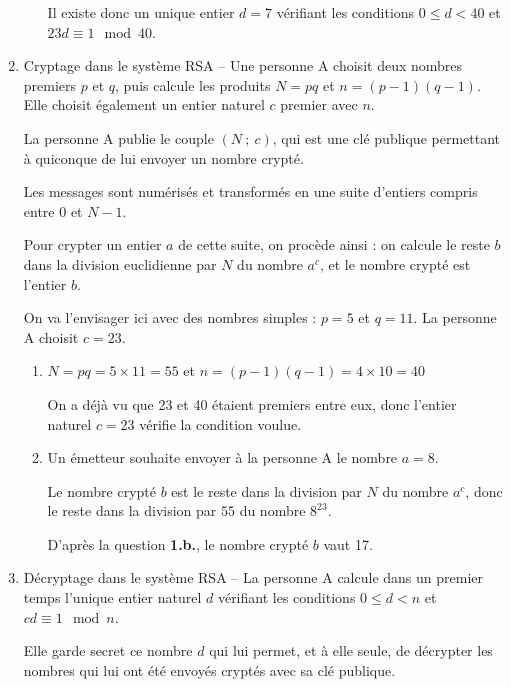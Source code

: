 \documentclass[10pt]{article}
\begin{document}
\begin{enumerate}
\begin{enumerate}
Il existe donc un unique entier $d=7$ vérifiant les conditions $0 \leqslant d < 40$ et $23 d \equiv  1 \mod 40$.
		
 	\end{enumerate}
\item  Cryptage dans le système RSA -- 
Une personne A choisit deux nombres premiers $p$ et $q$, puis calcule les produits $N = p q$ et $n = (p - 1)(q - 1)$. Elle choisit également un entier naturel $c$ premier avec $n$.
	
La personne A publie le couple $(N~;~c)$, qui est une clé publique permettant à quiconque de lui envoyer un nombre crypté.
	
Les messages sont numérisés et transformés en une suite d'entiers compris entre $0$ et $N -1$.
	
Pour crypter un entier $a$ de cette suite, on procède ainsi : on calcule le reste $b$ dans la division euclidienne par $N$ du nombre $a^c$, et le nombre crypté est l'entier $b$.

\smallskip


On va l'envisager ici avec des nombres simples : $p = 5$ et $q = 11$.
La personne A choisit  $c = 23$.
	\begin{enumerate}
		\item $N=pq=5\times 11 = 55$ et $n=\left (p-1\right )\left (q-1\right )=4\times 10=40$
		
On a déjà vu que 23 et 40 étaient premiers entre eux, donc l'entier naturel $c=23$ vérifie la condition voulue. 	
		
		\item  Un émetteur souhaite envoyer à la personne A le nombre $a = 8$.
		
Le nombre crypté $b$ est le reste dans la division par $N$ du nombre $a^{c}$, donc le reste dans la division par $55$ du nombre $8^{23}$.

D'après la question \textbf{1.b.}, le nombre crypté $b$ vaut 17. 
	\end{enumerate}
\item Décryptage dans le système RSA --
La personne A calcule dans un premier temps l'unique entier naturel $d$ vérifiant les conditions $0 \leqslant d < n$ et $cd \equiv 1 \mod n$.

Elle garde secret ce nombre $d$ qui lui permet, et à elle seule, de décrypter les nombres qui lui ont été envoyés cryptés avec sa clé publique.


\end{enumerate}
\end{document}
